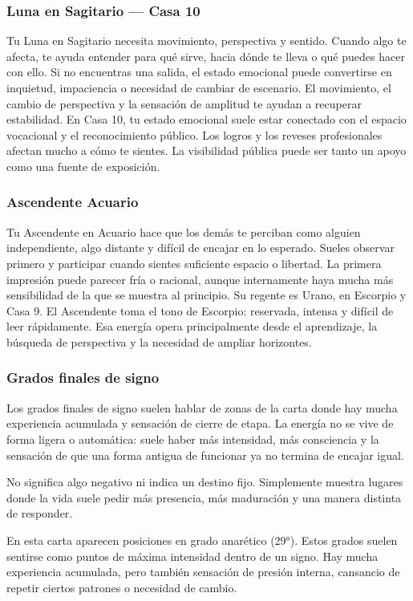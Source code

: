 \documentclass[11pt,a4paper]{article}\usepackage[utf8]{inputenc}
\begin{document}
\subsubsection*{Luna en Sagitario — Casa 10}
Tu Luna en Sagitario necesita movimiento, perspectiva y sentido. Cuando algo te afecta, te ayuda entender para qué sirve, hacia dónde te lleva o qué puedes hacer con ello. Si no encuentras una salida, el estado emocional puede convertirse en inquietud, impaciencia o necesidad de cambiar de escenario. El movimiento, el cambio de perspectiva y la sensación de amplitud te ayudan a recuperar estabilidad. En Casa 10, tu estado emocional suele estar conectado con el espacio vocacional y el reconocimiento público. Los logros y los reveses profesionales afectan mucho a cómo te sientes. La visibilidad pública puede ser tanto un apoyo como una fuente de exposición.

\subsubsection*{Ascendente Acuario}
Tu Ascendente en Acuario hace que los demás te perciban como alguien independiente, algo distante y difícil de encajar en lo esperado. Sueles observar primero y participar cuando sientes suficiente espacio o libertad. La primera impresión puede parecer fría o racional, aunque internamente haya mucha más sensibilidad de la que se muestra al principio. Su regente es Urano, en Escorpio y Casa 9. El Ascendente toma el tono de Escorpio: reservada, intensa y difícil de leer rápidamente. Esa energía opera principalmente desde el aprendizaje, la búsqueda de perspectiva y la necesidad de ampliar horizontes.

\subsubsection*{Grados finales de signo}
Los grados finales de signo suelen hablar de zonas de la carta donde hay mucha experiencia acumulada y sensación de       cierre de etapa. La energía no se vive de forma ligera o automática: suele haber más intensidad, más consciencia y la sensación de que una forma antigua de funcionar ya no termina de encajar igual.

No significa algo negativo ni indica un destino fijo. Simplemente muestra lugares donde la vida suele pedir más presencia, más maduración y una manera distinta de responder.

En esta carta aparecen posiciones en grado anarético (29°). Estos grados suelen sentirse como puntos de máxima intensidad dentro de un signo. Hay mucha experiencia acumulada, pero también sensación de presión interna, cansancio de repetir ciertos patrones o necesidad de cambio.
\end{document}

